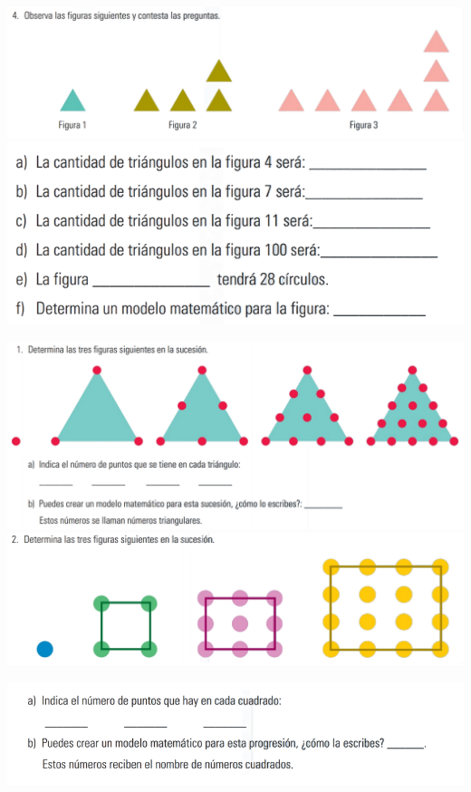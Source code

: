 
\question \includegraphics[scale=0.4]{p/i021.png} 
\includegraphics[scale=0.5]{p/i031.png} 

\includegraphics[scale=0.4]{p/i041.png} 
\includegraphics[scale=0.4]{p/i051.png} 

\includegraphics[scale=0.4]{p/i061.png} 
